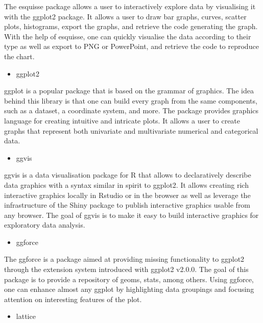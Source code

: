 \documentclass[
]{report}
\providecommand{\tightlist}{%
  \setlength{\itemsep}{0pt}\setlength{\parskip}{0pt}}
\begin{document}
The esquisse package allows a user to interactively explore data by visualising it with the ggplot2 package. It allows a user to draw bar graphs, curves, scatter plots, histograms, export the graphs, and retrieve the code generating the graph. With the help of esquisse, one can quickly visualise the data according to their type as well as export to PNG or PowerPoint, and retrieve the code to reproduce the chart.

\begin{itemize}
\tightlist
\item
  ggplot2
\end{itemize}

ggplot is a popular package that is based on the grammar of graphics. The idea behind this library is that one can build every graph from the same components, such as a dataset, a coordinate system, and more. The package provides graphics language for creating intuitive and intricate plots. It allows a user to create graphs that represent both univariate and multivariate numerical and categorical data.

\begin{itemize}
\tightlist
\item
  ggvis
\end{itemize}

ggvis is a data visualisation package for R that allows to declaratively describe data graphics with a syntax similar in spirit to ggplot2. It allows creating rich interactive graphics locally in Rstudio or in the browser as well as leverage the infrastructure of the Shiny package to publish interactive graphics usable from any browser. The goal of ggvis is to make it easy to build interactive graphics for exploratory data analysis.

\begin{itemize}
\tightlist
\item
  ggforce
\end{itemize}

The ggforce is a package aimed at providing missing functionality to ggplot2 through the extension system introduced with ggplot2 v2.0.0. The goal of this package is to provide a repository of geoms, stats, among others. Using ggforce, one can enhance almost any ggplot by highlighting data groupings and focusing attention on interesting features of the plot.

\begin{itemize}
\tightlist
\item
  lattice
\end{itemize}
\end{document}
